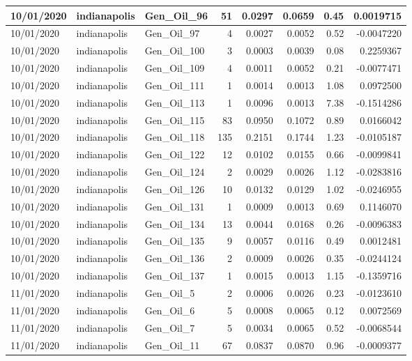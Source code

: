 \documentclass[
  letterpaper,
  DIV=11,
  numbers=noendperiod]{scrartcl}
\begin{document}
\begin{tabular}{l|l|l|r|r|r|r|r}
\hline
10/01/2020 & indianapolis & Gen\_Oil\_96 & 51 & 0.0297 & 0.0659 & 0.45 & 0.0019715\\
\hline
10/01/2020 & indianapolis & Gen\_Oil\_97 & 4 & 0.0027 & 0.0052 & 0.52 & -0.0047220\\
\hline
10/01/2020 & indianapolis & Gen\_Oil\_100 & 3 & 0.0003 & 0.0039 & 0.08 & 0.2259367\\
\hline
10/01/2020 & indianapolis & Gen\_Oil\_109 & 4 & 0.0011 & 0.0052 & 0.21 & -0.0077471\\
\hline
10/01/2020 & indianapolis & Gen\_Oil\_111 & 1 & 0.0014 & 0.0013 & 1.08 & 0.0972500\\
\hline
10/01/2020 & indianapolis & Gen\_Oil\_113 & 1 & 0.0096 & 0.0013 & 7.38 & -0.1514286\\
\hline
10/01/2020 & indianapolis & Gen\_Oil\_115 & 83 & 0.0950 & 0.1072 & 0.89 & 0.0166042\\
\hline
10/01/2020 & indianapolis & Gen\_Oil\_118 & 135 & 0.2151 & 0.1744 & 1.23 & -0.0105187\\
\hline
10/01/2020 & indianapolis & Gen\_Oil\_122 & 12 & 0.0102 & 0.0155 & 0.66 & -0.0099841\\
\hline
10/01/2020 & indianapolis & Gen\_Oil\_124 & 2 & 0.0029 & 0.0026 & 1.12 & -0.0283816\\
\hline
10/01/2020 & indianapolis & Gen\_Oil\_126 & 10 & 0.0132 & 0.0129 & 1.02 & -0.0246955\\
\hline
10/01/2020 & indianapolis & Gen\_Oil\_131 & 1 & 0.0009 & 0.0013 & 0.69 & 0.1146070\\
\hline
10/01/2020 & indianapolis & Gen\_Oil\_134 & 13 & 0.0044 & 0.0168 & 0.26 & -0.0096383\\
\hline
10/01/2020 & indianapolis & Gen\_Oil\_135 & 9 & 0.0057 & 0.0116 & 0.49 & 0.0012481\\
\hline
10/01/2020 & indianapolis & Gen\_Oil\_136 & 2 & 0.0009 & 0.0026 & 0.35 & -0.0244124\\
\hline
10/01/2020 & indianapolis & Gen\_Oil\_137 & 1 & 0.0015 & 0.0013 & 1.15 & -0.1359716\\
\hline
11/01/2020 & indianapolis & Gen\_Oil\_5 & 2 & 0.0006 & 0.0026 & 0.23 & -0.0123610\\
\hline
11/01/2020 & indianapolis & Gen\_Oil\_6 & 5 & 0.0008 & 0.0065 & 0.12 & 0.0072569\\
\hline
11/01/2020 & indianapolis & Gen\_Oil\_7 & 5 & 0.0034 & 0.0065 & 0.52 & -0.0068544\\
\hline
11/01/2020 & indianapolis & Gen\_Oil\_11 & 67 & 0.0837 & 0.0870 & 0.96 & -0.0009377\\

\end{tabular}
\end{document}
